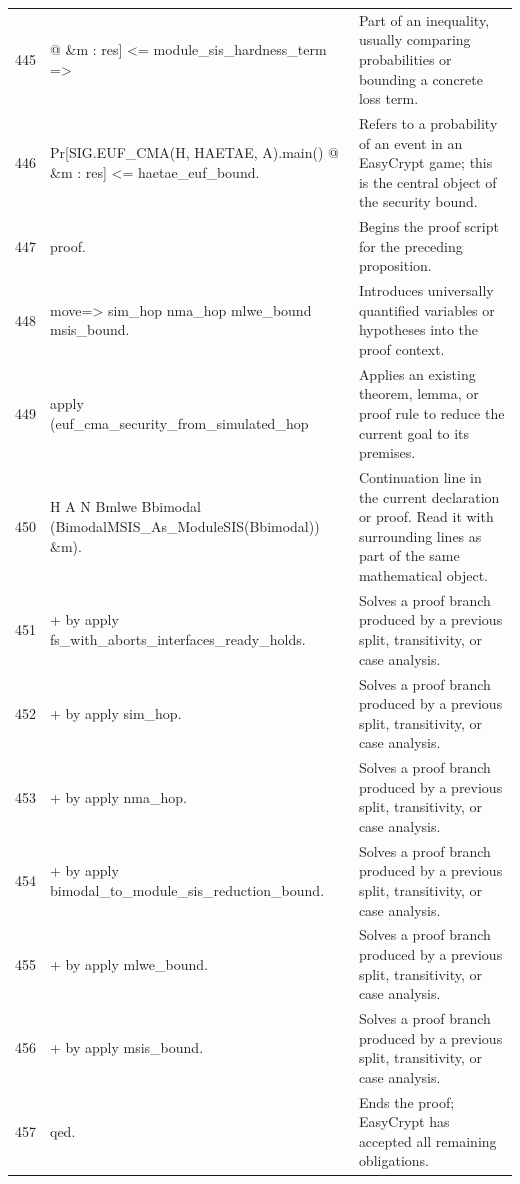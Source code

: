 \documentclass[10pt]{article}
\begin{document}
\begin{longtable}{r L{0.53\textwidth} L{0.37\textwidth}}
445 & {\ttfamily\scriptsize        @ \&m : res] <= module\_sis\_hardness\_term =>} & Part of an inequality, usually comparing probabilities or bounding a concrete loss term. \\
446 & {\ttfamily\scriptsize   Pr[SIG.EUF\_CMA(H, HAETAE, A).main() @ \&m : res] <= haetae\_euf\_bound.} & Refers to a probability of an event in an EasyCrypt game; this is the central object of the security bound. \\
447 & {\ttfamily\scriptsize proof.} & Begins the proof script for the preceding proposition. \\
448 & {\ttfamily\scriptsize move=> sim\_hop nma\_hop mlwe\_bound msis\_bound.} & Introduces universally quantified variables or hypotheses into the proof context. \\
449 & {\ttfamily\scriptsize apply (euf\_cma\_security\_from\_simulated\_hop} & Applies an existing theorem, lemma, or proof rule to reduce the current goal to its premises. \\
450 & {\ttfamily\scriptsize          H A N Bmlwe Bbimodal (BimodalMSIS\_As\_ModuleSIS(Bbimodal)) \&m).} & Continuation line in the current declaration or proof.  Read it with surrounding lines as part of the same mathematical object. \\
451 & {\ttfamily\scriptsize + by apply fs\_with\_aborts\_interfaces\_ready\_holds.} & Solves a proof branch produced by a previous split, transitivity, or case analysis. \\
452 & {\ttfamily\scriptsize + by apply sim\_hop.} & Solves a proof branch produced by a previous split, transitivity, or case analysis. \\
453 & {\ttfamily\scriptsize + by apply nma\_hop.} & Solves a proof branch produced by a previous split, transitivity, or case analysis. \\
454 & {\ttfamily\scriptsize + by apply bimodal\_to\_module\_sis\_reduction\_bound.} & Solves a proof branch produced by a previous split, transitivity, or case analysis. \\
455 & {\ttfamily\scriptsize + by apply mlwe\_bound.} & Solves a proof branch produced by a previous split, transitivity, or case analysis. \\
456 & {\ttfamily\scriptsize + by apply msis\_bound.} & Solves a proof branch produced by a previous split, transitivity, or case analysis. \\
457 & {\ttfamily\scriptsize qed.} & Ends the proof; EasyCrypt has accepted all remaining obligations. \\

\end{longtable}
\end{document}
